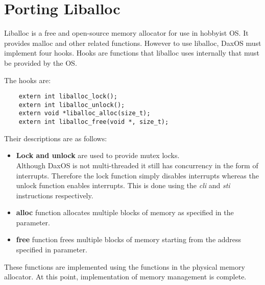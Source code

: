 \section{Porting Liballoc}\label{section:Porting liballoc}

Liballoc is a free and open-source memory allocator for use in hobbyist OS. 
It provides malloc and other related functions. However to use liballoc, DaxOS must implement four hooks.
Hooks are functions that liballoc uses internally that must be provided by the OS.

\vspace{0.3cm}
The hooks are:
\begin{lstlisting}
    extern int liballoc_lock();
    extern int liballoc_unlock();
    extern void *liballoc_alloc(size_t);
    extern int liballoc_free(void *, size_t);
\end{lstlisting}

Their descriptions are as follows:
\begin{itemize}
    \item \textbf{Lock and unlock} are used to provide mutex locks.\\
    Although DaxOS is not multi-threaded it still has concurrency in the form of interrupts.
    Therefore the lock function simply disables interrupts whereas the unlock function enables interrupts.
    This is done using the \textit{cli} and \textit{sti} instructions respectively.
    \item \textbf{alloc} function allocates multiple blocks of memory as specified in the parameter.
    \item \textbf{free} function frees multiple blocks of memory starting from the address specified in parameter.
\end{itemize}

These functions are implemented using the functions in the physical memory allocator.
At this point, implementation of memory management is complete.
